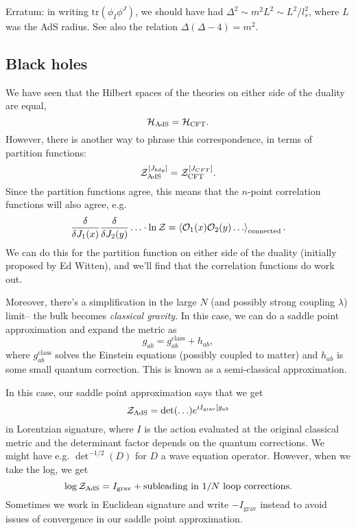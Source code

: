 Erratum: in writing $\text{tr}(\phi_I \phi^J)$, we should have had $\Delta^2 \sim m^2 L^2 \sim L^2/l_s^2$, where $L$ was the AdS radius. See also the relation $\Delta(\Delta-4)=m^2$.

\subsection*{Black holes}
We have seen that the Hilbert spaces of the theories on either side of the duality are equal,
\begin{equation}
    \mathcal H_{\text{AdS}} = \mathcal H_\text{CFT}.
\end{equation}
However, there is another way to phrase this correspondence, in terms of partition functions:
\begin{equation}
    \mathcal Z^{[J_{bdy}]}_\text{AdS} = \mathcal Z^{[J_{CFT}]}_\text{CFT}.
\end{equation}
Since the partition functions agree, this means that the $n$-point correlation functions will also agree, e.g.
\begin{equation}
    \frac{\delta}{\delta J_1(x)}\frac{\delta}{\delta J_2(y)}\ldots \cdot \ln \mathcal Z = \left< \mathcal O_1(x) \mathcal O_2(y)\ldots \right>_\text{connected}.
\end{equation}
We can do this for the partition function on either side of the duality (initially proposed by Ed Witten), and we'll find that the correlation functions do work out.

Moreover, there's a simplification in the large $N$ (and possibly strong coupling $\lambda$) limit-- the bulk becomes \emph{classical gravity}. In this case, we can do a saddle point approximation and expand the metric as
\begin{equation}
    g_{ab}=g_{ab}^\text{class}+h_{ab},
\end{equation}
where $g_{ab}^\text{class}$ solves the Einstein equations (possibly coupled to matter) and $h_{ab}$ is some small quantum correction. This is known as a semi-classical approximation.

In this case, our saddle point approximation says that we get
\begin{equation}
    \mathcal Z_\text{AdS}=\det(\ldots)e^{i I_\text{grav}[g_{ab}}
\end{equation}
in Lorentzian signature, where $I$ is the action evaluated at the original classical metric and the determinant factor depends on the quantum corrections. We might have e.g. $\det^{-1/2}(D)$ for $D$ a wave equation operator. However, when we take the log, we get
\begin{equation}
    \log \mathcal Z_\text{AdS} = I_\text{grav} + \text{subleading in }1/N\text{ loop corrections}.
\end{equation}
Sometimes we work in Euclidean signature and write $-I_\text{grav}$ instead to avoid issues of convergence in our saddle point approximation.

